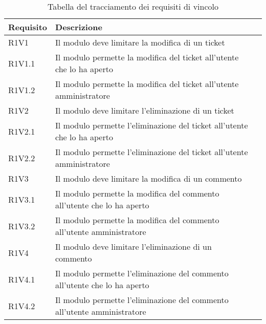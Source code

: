 \begin{table}[!h]
{\renewcommand{\arraystretch}{2}
\caption{Tabella del tracciamento dei requisiti di vincolo}
\label{tab:requisiti-vincolo}
\begin{tabularx}{\textwidth}{lXl}
\hline\hline
\textbf{Requisito} & \textbf{Descrizione} \\
\hline
R1V1 & Il modulo deve limitare la modifica di un ticket\\
\hline
R1V1.1 & Il modulo permette la modifica del ticket all'utente che lo ha aperto\\
\hline
R1V1.2 & Il modulo permette la modifica del ticket all'utente amministratore\\
\hline
R1V2 & Il modulo deve limitare l'eliminazione di un ticket\\
\hline
R1V2.1 & Il modulo permette l'eliminazione del ticket all'utente che lo ha aperto\\
\hline
R1V2.2 & Il modulo permette l'eliminazione del ticket all'utente amministratore\\
\hline

R1V3 & Il modulo deve limitare la modifica di un commento\\
\hline
R1V3.1 & Il modulo permette la modifica del commento all'utente che lo ha aperto\\
\hline
R1V3.2 & Il modulo permette la modifica del commento all'utente amministratore\\
\hline

R1V4 & Il modulo deve limitare l'eliminazione di un commento\\
\hline
R1V4.1 & Il modulo permette l'eliminazione del commento all'utente che lo ha aperto\\
\hline
R1V4.2 & Il modulo permette l'eliminazione del commento all'utente amministratore\\
\hline

\end{tabularx}
}
\end{table}

